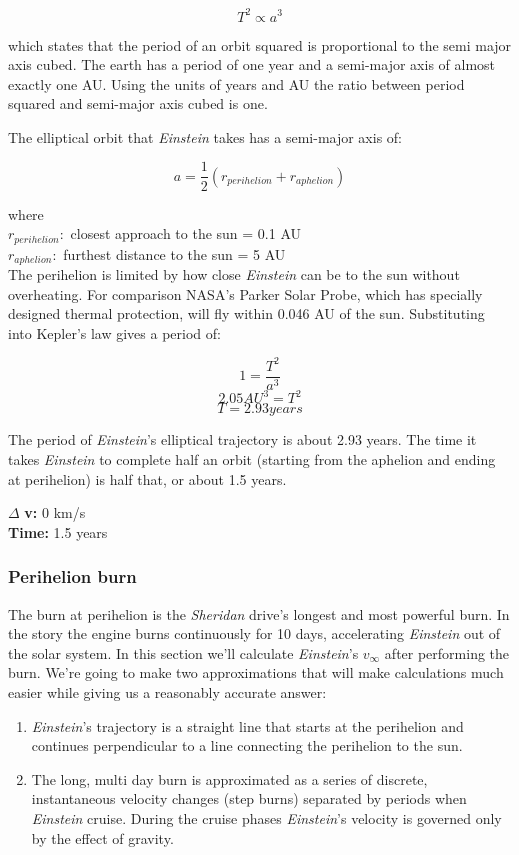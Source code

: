 \documentclass[12pt]{article} %
\begin{document}
$$T^2 \propto a^3$$

which states that the period of an orbit squared is proportional to the semi major axis cubed. The earth has a period of one year and a semi-major axis of almost exactly one AU. Using the units of years and AU the ratio between period squared and semi-major axis cubed is one.

The elliptical orbit that \textit{Einstein} takes has a semi-major axis of:

$$a = \frac{1}{2}(r_{perihelion} + r_{aphelion})$$

where\\
$r_{perihelion}:$ closest approach to the sun = 0.1 AU\\
$r_{aphelion}:$ furthest distance to the sun = 5 AU\\

The perihelion is limited by how close \textit{Einstein} can be to the sun without overheating. For comparison NASA's Parker Solar Probe, which has specially designed thermal protection, will fly within 0.046 AU of the sun. Substituting into Kepler's law gives a period of:

$$1 = \frac{T^2}{a^3}$$
$$2.05AU^{3} = T^2$$
$$T = 2.93 years$$

The period of \textit{Einstein}'s elliptical trajectory is about 2.93 years. The time it takes \textit{Einstein} to complete half an orbit (starting from the aphelion and ending at perihelion) is half that, or about 1.5 years.

$\Delta$ \textbf{v:} 0 km/s\\
\textbf{Time:} 1.5 years

\subsubsection{Perihelion burn}
The burn at perihelion is the \textit{Sheridan} drive's longest and most powerful burn. In the story the engine burns continuously for 10 days, accelerating \textit{Einstein} out of the solar system. In this section we'll calculate \textit{Einstein}'s $v_{\infty}$ after performing the burn. We're going to make two approximations that will make calculations much easier while giving us a reasonably accurate answer:

\begin{enumerate}
\item \textit{Einstein}'s trajectory is a straight line that starts at the perihelion and continues perpendicular to a line connecting the perihelion to the sun.
\item The long, multi day burn is approximated as a series of discrete, instantaneous velocity changes (step burns) separated by periods when \textit{Einstein} cruise. During the cruise phases \textit{Einstein}'s velocity is governed only by the effect of gravity.
\end{enumerate}
\end{document}
